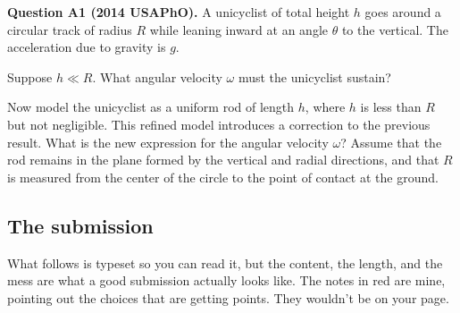 \documentclass[11pt]{article}
\newcommand{\ann}[1]{{\color{gradered}\sffamily\footnotesize #1}}
\begin{document}
\begin{official}
\textbf{Question A1 (2014 USAPhO).} A unicyclist of total height $h$ goes around a circular
track of radius $R$ while leaning inward at an angle $\theta$ to the vertical. The
acceleration due to gravity is $g$.

\begin{subpart}
\item Suppose $h \ll R$. What angular velocity $\omega$ must the unicyclist sustain?
\item Now model the unicyclist as a uniform rod of length $h$, where $h$ is less than $R$
but not negligible. This refined model introduces a correction to the previous result. What
is the new expression for the angular velocity $\omega$? Assume that the rod remains in the
plane formed by the vertical and radial directions, and that $R$ is measured from the center
of the circle to the point of contact at the ground.
\end{subpart}
\end{official}

\subsection*{The submission}

What follows is typeset so you can read it, but the content, the length, and the mess are
what a good submission actually looks like. The notes in \ann{red} are mine, pointing out
the choices that are getting points. They wouldn't be on your page.
\end{document}
